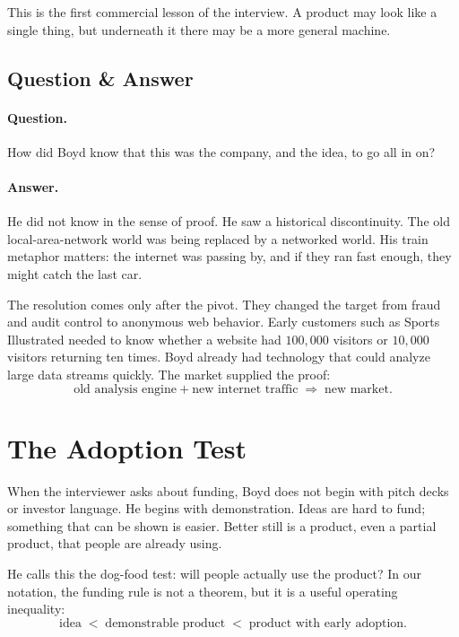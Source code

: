 This is the first commercial lesson of the interview. A product may look like a single thing, but underneath it there may be a more general machine.

\subsection{Question \& Answer}

\paragraph{Question.}
How did Boyd know that this was the company, and the idea, to go all in on?

\paragraph{Answer.}
He did not know in the sense of proof. He saw a historical discontinuity. The old local-area-network world was being replaced by a networked world. His train metaphor matters: the internet was passing by, and if they ran fast enough, they might catch the last car.

The resolution comes only after the pivot. They changed the target from fraud and audit control to anonymous web behavior. Early customers such as Sports Illustrated needed to know whether a website had \(100{,}000\) visitors or \(10{,}000\) visitors returning ten times. Boyd already had technology that could analyze large data streams quickly. The market supplied the proof:
\begin{equation}
\text{old analysis engine} + \text{new internet traffic}
\;\Longrightarrow\;
\text{new market}.
\end{equation}

\section{The Adoption Test}

When the interviewer asks about funding, Boyd does not begin with pitch decks or investor language. He begins with demonstration. Ideas are hard to fund; something that can be shown is easier. Better still is a product, even a partial product, that people are already using.

He calls this the dog-food test: will people actually use the product? In our notation, the funding rule is not a theorem, but it is a useful operating inequality:
\begin{equation}
\text{idea}
\;<\;
\text{demonstrable product}
\;<\;
\text{product with early adoption}.
\end{equation}

